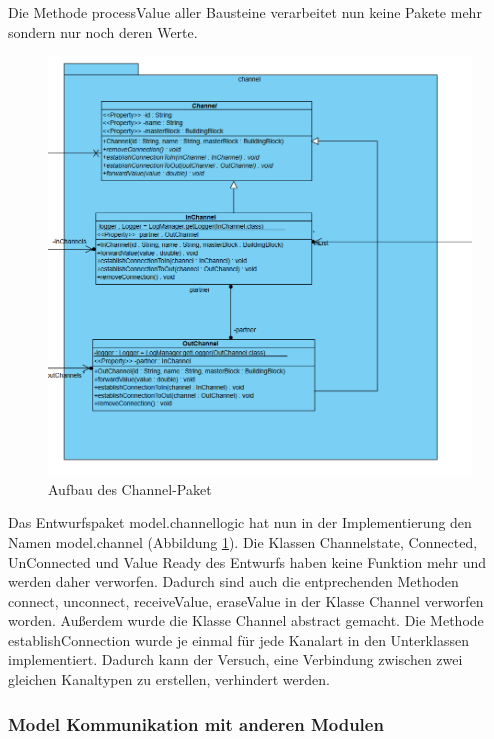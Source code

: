\documentclass[parskip=full]{scrartcl}
\begin{document}
Die Methode processValue aller Bausteine verarbeitet nun keine Pakete mehr sondern nur noch deren Werte.

\begin{figure}[htbp]
	\begin{center}
		\includegraphics[width = 14cm]{Grafiken/channel.PNG}
		\caption{Aufbau des Channel-Paket}
		\label{channel}
	\end{center}
\end{figure}

Das Entwurfspaket model.channellogic hat nun in der Implementierung den Namen model.channel (Abbildung \ref{channel}). Die Klassen Channelstate, Connected, UnConnected und Value Ready des Entwurfs haben keine Funktion mehr und werden daher verworfen. Dadurch sind auch die entprechenden Methoden connect, unconnect, receiveValue, eraseValue in der Klasse Channel verworfen worden. Außerdem wurde die Klasse Channel abstract gemacht. Die Methode establishConnection wurde je einmal für jede Kanalart in den Unterklassen implementiert. Dadurch kann der Versuch, eine Verbindung zwischen zwei gleichen Kanaltypen zu erstellen, verhindert werden. 


\subsubsection{Model Kommunikation mit anderen Modulen}
\end{document}
